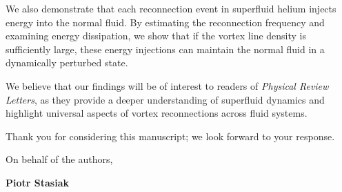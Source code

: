 \documentclass[a4paper,10pt]{letter}
\begin{document}
We also demonstrate that each reconnection event in superfluid helium injects energy 
into the normal fluid. 
By estimating the reconnection frequency and examining energy dissipation, we show that 
if the vortex line density is sufficiently large, these energy injections 
can maintain the normal fluid in a dynamically perturbed state.

We believe that our findings will be of interest to readers of \textit{Physical Review Letters}, 
as they provide a deeper understanding of superfluid dynamics and highlight universal aspects of 
vortex reconnections across fluid systems. 

Thank you for considering this manuscript; we look forward to your response.
\vspace{0.5cm}

On behalf of the authors,

\vspace{1cm}

\textbf{Piotr Stasiak}
\end{document}
